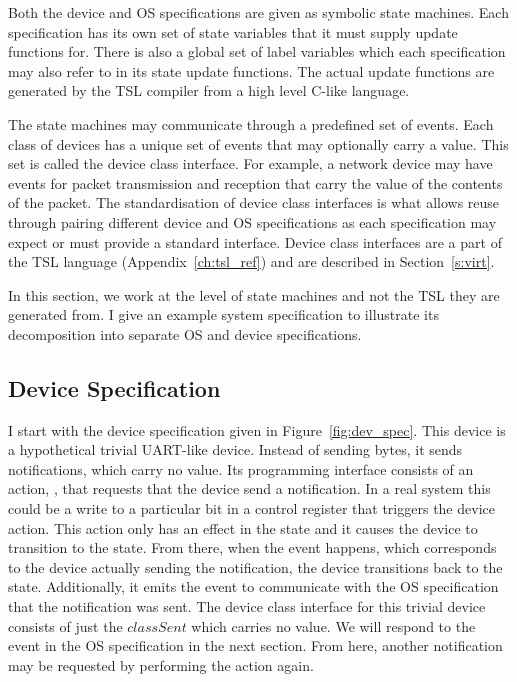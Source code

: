 Both the device and OS specifications are given as symbolic state machines. Each specification has its own set of state variables that it must supply update functions for. There is also a global set of label variables which each specification may also refer to in its state update functions. The actual update functions are generated by the TSL compiler from a high level C-like language. 

The state machines may communicate through a predefined set of events. Each class of devices has a unique set of events that may optionally carry a value. This set is called the device class interface. For example, a network device may have events for packet transmission and reception that carry the value of the contents of the packet. The standardisation of device class interfaces is what allows reuse through pairing different device and OS specifications as each specification may expect or must provide a standard interface. Device class interfaces are a part of the TSL language (Appendix~\ref{ch:tsl_ref}) and are described in Section~\ref{s:virt}.

In this section, we work at the level of state machines and not the TSL they are generated from. I give an example system specification to illustrate its decomposition into separate OS and device specifications. 

\subsection{Device Specification}

I start with the device specification given in Figure~\ref{fig:dev_spec}. This device is a hypothetical trivial UART-like device. Instead of sending bytes, it sends notifications, which carry no value. Its programming interface consists of an action, , that requests that the device send a notification. In a real system this could be a write to a particular bit in a control register that triggers the device action. This action only has an effect in the  state and it causes the device to transition to the  state. From there, when the  event happens, which corresponds to the device actually sending the notification, the device transitions back to the  state. Additionally, it emits the  event to communicate with the OS specification that the notification was sent. The device class interface for this trivial device consists of just the $classSent$ which carries no value. We will respond to the  event in the OS specification in the next section. From here, another notification may be requested by performing the  action again.

